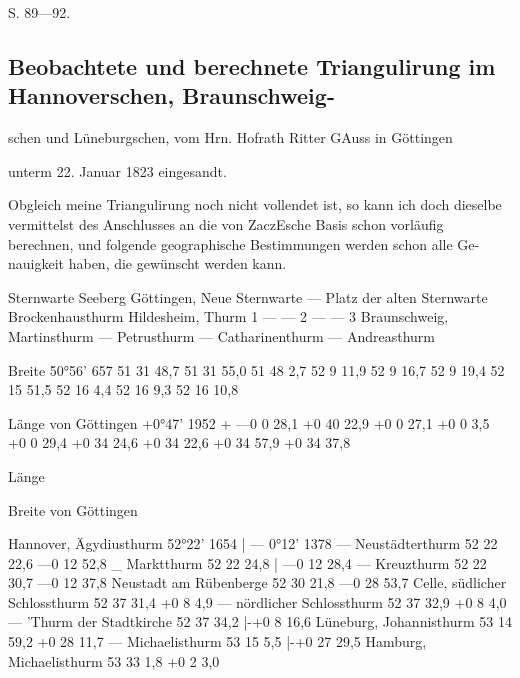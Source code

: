 \documentclass[12pt,a4paper]{article}
\theoremstyle{plain}
\theoremstyle{definition}
\theoremstyle{remark}
\begin{document}
\noindent
S. 89---92.

\noindent
[1.]

\noindent

\subsection*{Beobachtete und berechnete Triangulirung im Hannoverschen, Braunschweig-}
schen und Lüneburgschen, vom Hrn. Hofrath Ritter GAuss in Göttingen

\noindent
unterm 22. Januar 1823 eingesandt.

\noindent
Obgleich meine Triangulirung noch nicht vollendet ist, so kann ich doch
dieselbe vermittelst des Anschlusses an die von ZaczEsche Basis schon vorläufig
berechnen, und folgende geographische Bestimmungen werden schon alle Ge-
nauigkeit haben, die gewünscht werden kann.

\noindent
Sternwarte Seeberg
Göttingen, Neue Sternwarte
--- Platz der alten Sternwarte
Brockenhausthurm
Hildesheim, Thurm 1
--- --- 2
--- --- 3
Braunschweig, Martinsthurm
--- Petrusthurm
--- Catharinenthurm
--- Andreasthurm

\noindent
Breite
50°56' 657
51 31 48,7
51 31 55,0
51 48 2,7
52 9 11,9
52 9 16,7
52 9 19,4
52 15 51,5
52 16 4,4
52 16 9,3
52 16 10,8

\noindent
[Östl.] Länge
von Göttingen
+0°47' 1952 +
---0 0 28,1
+0 40 22,9
+0 0 27,1
+0 0 3,5
+0 0 29,4
+0 34 24,6
+0 34 22,6
+0 34 57,9
+0 34 37,8

\noindent

\noindent
[Östl.] Länge

\noindent
Breite von Göttingen

\noindent
Hannover, Ägydiusthurm 52°22' 1654 | --- 0°12' 1378
--- Neustädterthurm 52 22 22,6 ---0 12 52,8
\_ Marktthurm 52 22 24,8 | ---0 12 28,4
--- Kreuzthurm 52 22 30,7 ---0 12 37,8
Neustadt am Rübenberge 52 30 21,8 ---0 28 53,7
Celle, südlicher Schlossthurm 52 37 31,4 +0 8 4,9
--- nördlicher Schlossthurm 52 37 32,9 +0 8 4,0
--- 'Thurm der Stadtkirche 52 37 34,2 |-+0 8 16,6
Lüneburg, Johannisthurm 53 14 59,2 +0 28 11,7
--- Michaelisthurm 53 15 5,5 |-+0 27 29,5
Hamburg, Michaelisthurm 53 33 1,8 +0 2 3,0
\end{document}
